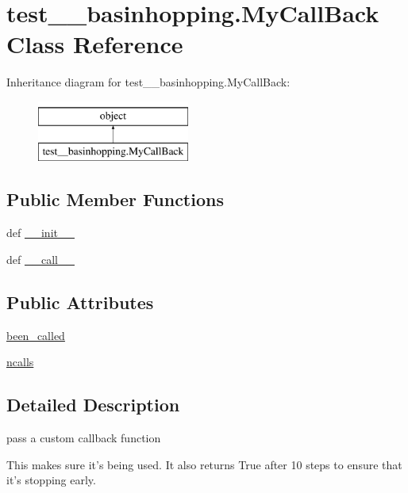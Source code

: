 \hypertarget{classtest____basinhopping_1_1MyCallBack}{}\section{test\+\_\+\+\_\+basinhopping.\+My\+Call\+Back Class Reference}
\label{classtest____basinhopping_1_1MyCallBack}
Inheritance diagram for test\+\_\+\+\_\+basinhopping.\+My\+Call\+Back\+:\begin{figure}[H]
\begin{center}
\leavevmode
\includegraphics[height=2.000000cm]{classtest____basinhopping_1_1MyCallBack}
\end{center}
\end{figure}
\subsection*{Public Member Functions}
\begin{DoxyCompactItemize}
\item 
def \hyperlink{classtest____basinhopping_1_1MyCallBack_aee35b1bc60d1ea6df31237943b07ecae}{\+\_\+\+\_\+init\+\_\+\+\_\+}
\item 
def \hyperlink{classtest____basinhopping_1_1MyCallBack_ae6ea6ff2eec426a19e55019b11048095}{\+\_\+\+\_\+call\+\_\+\+\_\+}
\end{DoxyCompactItemize}
\subsection*{Public Attributes}
\begin{DoxyCompactItemize}
\item 
\hyperlink{classtest____basinhopping_1_1MyCallBack_a373aee3892a9063fb6d92cb0708bf408}{been\+\_\+called}
\item 
\hyperlink{classtest____basinhopping_1_1MyCallBack_a727756bb6255d7c453d2579d32679ec1}{ncalls}
\end{DoxyCompactItemize}


\subsection{Detailed Description}
\begin{DoxyVerb}pass a custom callback function

This makes sure it's being used.  It also returns True after 10
steps to ensure that it's stopping early.\end{DoxyVerb}
 

